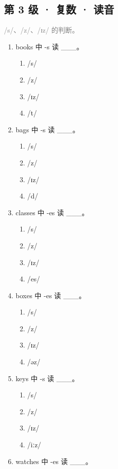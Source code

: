 \documentclass[11pt,a4paper]{ctexart}
\begin{document}
\subsection*{第 3 级 · 复数 · 读音}
\noindent\textcolor{gray}{/s/、/z/、/ɪz/ 的判断。}\par\smallskip
\begin{enumerate}[leftmargin=*,itemsep=4pt]
\item books 中 -s 读 \_\_\_。
\begin{enumerate}[label=\Alph*.,leftmargin=2em,itemsep=1pt,topsep=2pt]
\item /s/
\item /z/
\item /ɪz/
\item /t/
\end{enumerate}
\item bags 中 -s 读 \_\_\_。
\begin{enumerate}[label=\Alph*.,leftmargin=2em,itemsep=1pt,topsep=2pt]
\item /s/
\item /z/
\item /ɪz/
\item /d/
\end{enumerate}
\item classes 中 -es 读 \_\_\_。
\begin{enumerate}[label=\Alph*.,leftmargin=2em,itemsep=1pt,topsep=2pt]
\item /s/
\item /z/
\item /ɪz/
\item /es/
\end{enumerate}
\item boxes 中 -es 读 \_\_\_。
\begin{enumerate}[label=\Alph*.,leftmargin=2em,itemsep=1pt,topsep=2pt]
\item /s/
\item /z/
\item /ɪz/
\item /əz/
\end{enumerate}
\item keys 中 -s 读 \_\_\_。
\begin{enumerate}[label=\Alph*.,leftmargin=2em,itemsep=1pt,topsep=2pt]
\item /s/
\item /z/
\item /ɪz/
\item /iːz/
\end{enumerate}
\item watches 中 -es 读 \_\_\_。

\end{enumerate}
\end{document}
